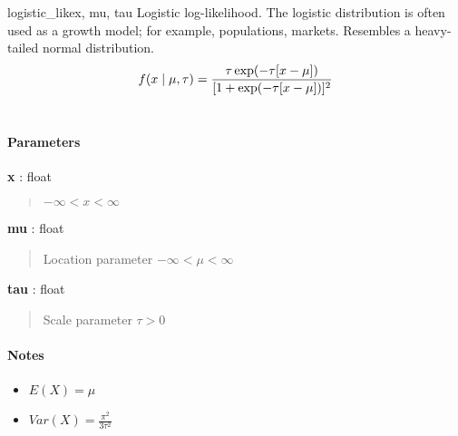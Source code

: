 \hypertarget{pymc.distributions.logistic_like}{}
\begin{funcdesc}{logistic\_like}{x, mu, tau}
Logistic log-likelihood. The logistic distribution is often used as a growth model; for example,
populations, markets. Resembles a heavy-tailed normal distribution.
\begin{gather}
\begin{split}f(x \mid \mu, \tau) = \frac{\tau \exp(-\tau[x-\mu])}{[1 + \exp(-\tau[x-\mu])]^2}\end{split}\notag\\\begin{split}\end{split}\notag
\end{gather}\paragraph{Parameters}\begin{paramlist}

\item[] \textbf{x} : float
\begin{quote}

$-\infty < x < \infty$
\end{quote}

\item[] \textbf{mu} : float
\begin{quote}

Location parameter $-\infty < \mu < \infty$
\end{quote}

\item[] \textbf{tau} : float
\begin{quote}

Scale parameter $\tau > 0$
\end{quote}
\end{paramlist}
\paragraph{Notes}
\begin{itemize}
\item {} 
$E(X) = \mu$

\item {} 
$Var(X) = \frac{\pi^2}{3\tau^2}$

\end{itemize}
\end{funcdesc}

